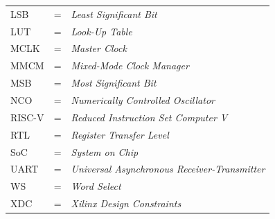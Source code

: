 \begin{tabular}{llp{4in}}
    LSB   & \hspace{1cm} = & \textit{Least Significant Bit} \\
    LUT   & \hspace{1cm} = & \textit{Look-Up Table} \\
    MCLK  & \hspace{1cm} = & \textit{Master Clock} \\
    MMCM  & \hspace{1cm} = & \textit{Mixed-Mode Clock Manager} \\
    MSB   & \hspace{1cm} = & \textit{Most Significant Bit} \\
    NCO   & \hspace{1cm} = & \textit{Numerically Controlled Oscillator} \\
    RISC-V& \hspace{1cm} = & \textit{Reduced Instruction Set Computer V} \\
    RTL   & \hspace{1cm} = & \textit{Register Transfer Level} \\
    SoC   & \hspace{1cm} = & \textit{System on Chip} \\
    UART  & \hspace{1cm} = & \textit{Universal Asynchronous Receiver-Transmitter} \\
    WS    & \hspace{1cm} = & \textit{Word Select} \\
    XDC   & \hspace{1cm} = & \textit{Xilinx Design Constraints} \\
\end{tabular}
